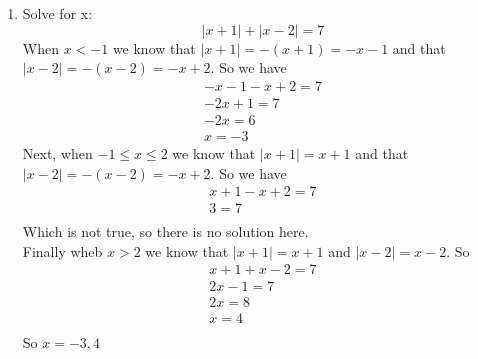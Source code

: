 \documentclass[12pt]{article}
\begin{document}
\begin{enumerate}
\begin{proof}
	      \end{proof}
	      \pagebreak
	\item Solve for x:
	      \begin{equation*}
		      |x+1| + |x-2| = 7
	      \end{equation*}
	      When $x < -1$ we know that $|x+1| = -(x+1) = -x-1$ and that \\
	      $|x-2| = -(x-2) = -x+2$. So we have
	      \begin{gather*}
		      -x-1 - x+2 = 7 \\
		      -2x + 1 = 7 \\
		      -2x = 6 \\
		      x = -3
	      \end{gather*}
	      Next, when $-1 \leq x \leq 2$ we know that $|x+1| = x+1$ and that \\
	      $|x-2| = -(x-2) = -x+2$. So we have
	      \begin{gather*}
		      x+1 - x+2 = 7 \\
		      3=7 \\
	      \end{gather*}
	      Which is not true, so there is no solution here. \\
	      Finally wheb $x > 2$ we know that $|x+1| = x+1$ and $|x-2| = x-2$. So
	      \begin{gather*}
		      x+1 + x-2=7 \\
		      2x-1 = 7 \\
		      2x=8 \\
		      x=4 \\
	      \end{gather*}
          So $x = {-3,4}$
\end{enumerate}
\end{document}
